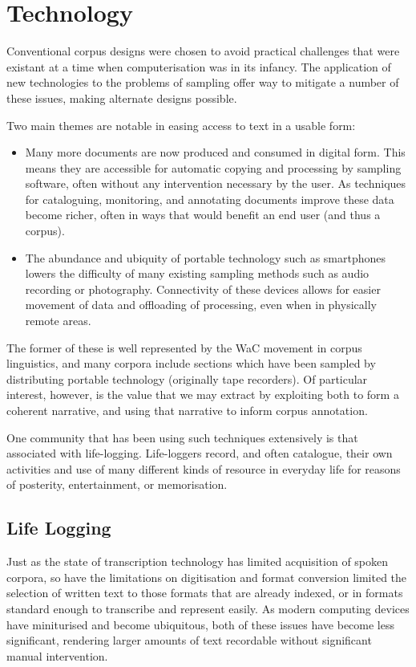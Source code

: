 \section{Technology}
Conventional corpus designs were chosen to avoid practical challenges that were existant at a time when computerisation was in its infancy.  The application of new technologies to the problems of sampling offer way to mitigate a number of these issues, making alternate designs possible.

Two main themes are notable in easing access to text in a usable form:

\begin{itemize}
    \item Many more documents are now produced and consumed in digital form.  This means they are accessible for automatic copying and processing by sampling software, often without any intervention necessary by the user.  As techniques for cataloguing, monitoring, and annotating documents improve these data become richer, often in ways that would benefit an end user (and thus a corpus).
    \item The abundance and ubiquity of portable technology such as smartphones lowers the difficulty of many existing sampling methods such as audio recording or photography.  Connectivity of these devices allows for easier movement of data and offloading of processing, even when in physically remote areas.
\end{itemize}


The former of these is well represented by the WaC movement in corpus linguistics, and many corpora include sections which have been sampled by distributing portable technology (originally tape recorders).  Of particular interest, however, is the value that we may extract by exploiting both to form a coherent narrative, and using that narrative to inform corpus annotation.

One community that has been using such techniques extensively is that associated with life-logging.  Life-loggers record, and often catalogue, their own activities and use of many different kinds of resource in everyday life for reasons of posterity, entertainment, or memorisation.










\subsection{Life Logging}
Just as the state of transcription technology has limited acquisition of spoken corpora, so have the limitations on digitisation and format conversion limited the selection of written text to those formats that are already indexed, or in formats standard enough to transcribe and represent easily.   As modern computing devices have miniturised and become ubiquitous, both of these issues have become less significant, rendering larger amounts of text recordable without significant manual intervention.

